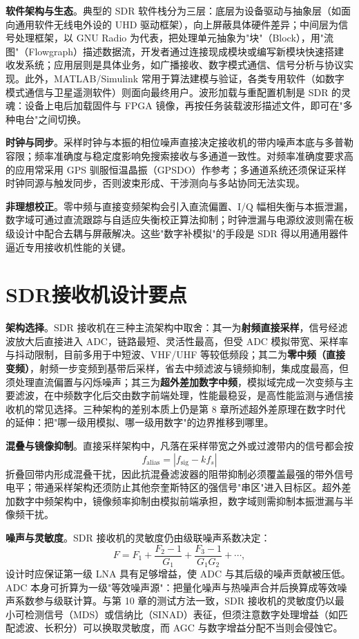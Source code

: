 \textbf{软件架构与生态}。典型的 SDR 软件栈分为三层：底层为设备驱动与抽象层（如面向通用软件无线电外设的 UHD 驱动框架），向上屏蔽具体硬件差异；中间层为信号处理框架，以 GNU Radio 为代表，把处理单元抽象为"块"（Block），用"流图"（Flowgraph）描述数据流，开发者通过连接现成模块或编写新模块快速搭建收发系统；应用层则是具体业务，如广播接收、数字模式通信、信号分析与协议实现。此外，MATLAB/Simulink 常用于算法建模与验证，各类专用软件（如数字模式通信与卫星遥测软件）则面向最终用户。波形加载与重配置机制是 SDR 的灵魂：设备上电后加载固件与 FPGA 镜像，再按任务装载波形描述文件，即可在"多种电台"之间切换。

\textbf{时钟与同步}。采样时钟与本振的相位噪声直接决定接收机的带内噪声本底与多普勒容限；频率准确度与稳定度影响免搜索接收与多通道一致性。对频率准确度要求高的应用常采用 GPS 驯服恒温晶振（GPSDO）作参考；多通道系统还须保证采样时钟同源与触发同步，否则波束形成、干涉测向与多站协同无法实现。

\textbf{非理想校正}。零中频与直接变频架构会引入直流偏置、I/Q 幅相失衡与本振泄漏，数字域可通过直流跟踪与自适应失衡校正算法抑制；时钟泄漏与电源纹波则需在板级设计中配合去耦与屏蔽解决。这些"数字补模拟"的手段是 SDR 得以用通用器件逼近专用接收机性能的关键。

\section{SDR接收机设计要点}
\label{sec:sdr_receiver_design}

\textbf{架构选择}。SDR 接收机在三种主流架构中取舍：其一为\textbf{射频直接采样}，信号经滤波放大后直接进入 ADC，链路最短、灵活性最高，但受 ADC 模拟带宽、采样率与抖动限制，目前多用于中短波、VHF/UHF 等较低频段；其二为\textbf{零中频（直接变频）}，射频一步变频到基带后采样，省去中频滤波与镜频抑制，集成度最高，但须处理直流偏置与闪烁噪声；其三为\textbf{超外差加数字中频}，模拟域完成一次变频与主要滤波，在中频数字化后交由数字前端处理，性能最稳妥，是高性能监测与通信接收机的常见选择。三种架构的差别本质上仍是第 8 章所述超外差原理在数字时代的延伸：把"哪一级用模拟、哪一级用数字"的边界推移到哪里。

\textbf{混叠与镜像抑制}。直接采样架构中，凡落在采样带宽之外或过渡带内的信号都会按
\[
f_{\mathrm{alias}} = \left| f_{\mathrm{sig}} - k f_s \right|
\]
折叠回带内形成混叠干扰，因此抗混叠滤波器的阻带抑制必须覆盖最强的带外信号电平；带通采样架构还须防止其他奈奎斯特区的强信号"串区"进入目标区。超外差加数字中频架构中，镜像频率抑制由模拟前端承担，数字域则需抑制本振泄漏与半像频干扰。

\textbf{噪声与灵敏度}。SDR 接收机的灵敏度仍由级联噪声系数决定：
\[
F = F_1 + \frac{F_2 - 1}{G_1} + \frac{F_3 - 1}{G_1 G_2} + \cdots,
\]
设计时应保证第一级 LNA 具有足够增益，使 ADC 与其后级的噪声贡献被压低。ADC 本身可折算为一级"等效噪声源"：把量化噪声与热噪声合并后换算成等效噪声系数参与级联计算。与第 10 章的测试方法一致，SDR 接收机的灵敏度仍以最小可检测信号（MDS）或信纳比（SINAD）表征，但须注意数字处理增益（如匹配滤波、长积分）可以换取灵敏度，而 AGC 与数字增益分配不当则会侵蚀它。

